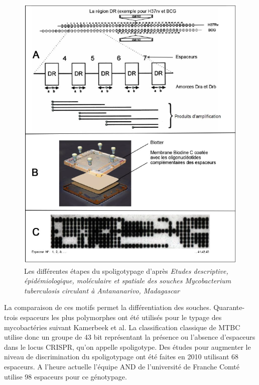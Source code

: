 \documentclass[twoside,a4paper,11pt,frenchb,openany]{report}
\begin{document}
\begin{figure}[h!]
\centering
\includegraphics[scale=0.4]{spoligo.png}
\caption{Les différentes étapes du spoligotypage d'après \textit{Etudes descriptive, épidémiologique, moléculaire et spatiale des souches Mycobacterium tuberculosis circulant à Antananarivo, Madagascar}}
\end{figure}

La comparaison de ces motifs permet la différentiation des souches. Quarante-trois espaceurs les plus polymorphes ont été utilisés pour le typage des mycobactéries suivant Kamerbeek et al. La classification classique de MTBC utilise donc un groupe de 43 bit représentant la présence ou l'absence d'espaceurs dans le locus CRISPR, qu'on appelle spoligotype. Des études pour augmenter le niveau de discrimination du spoligotypage ont été faites en 2010 utilisant 68 espaceurs. A l'heure actuelle l'équipe AND de l'université de Franche Comté utilise 98 espaceurs pour ce génotypage.
\end{document}
